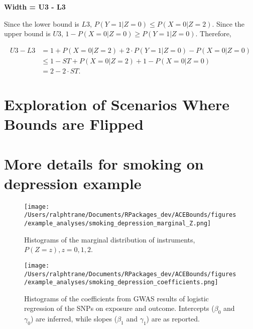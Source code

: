 \documentclass[
]{article}
\theoremstyle{plain}
\begin{document}
\textbf{Width = U3 - L3}

Since the lower bound is \(L3\), \(P(Y = 1 | Z = 0) \le P(X = 0 | Z = 2)\). Since the upper bound is \(U3\), \(1 - P(X = 0 | Z = 0) \ge P(Y = 1 | Z = 0)\). Therefore,

\[\begin{aligned}
U3 - L3 &= 1 + P(X = 0 | Z = 2) + 2\cdot P(Y = 1 | Z = 0) - P(X = 0 | Z = 0) \\
        &\le 1 - ST + P(X = 0 | Z = 2) + 1 - P(X = 0 | Z = 0) \\
        &= 2 - 2\cdot ST.
\end{aligned}\]

\newpage

\hypertarget{exploration-of-scenarios-where-bounds-are-flipped}{%
\section{Exploration of Scenarios Where Bounds are Flipped}\label{exploration-of-scenarios-where-bounds-are-flipped}}

\hypertarget{more-details-for-smoking-on-depression-example}{%
\section{\texorpdfstring{More details for smoking on depression example \label{smoking-on-depression-appendix}}{More details for smoking on depression example }}\label{more-details-for-smoking-on-depression-example}}

\begin{figure}[H]
  \center
  \texttt{[image: /Users/ralphtrane/Documents/RPackages\_dev/ACEBounds/figures/example\_analyses/smoking\_depression\_marginal\_Z.png]}
  \caption{Histograms of the marginal distribution of instruments, $P(Z = z), z=0,1,2$.}
  \label{fig:marginal-distribution-of-instruments}
\end{figure}

\begin{figure}[H]
  \center
  \texttt{[image: /Users/ralphtrane/Documents/RPackages\_dev/ACEBounds/figures/example\_analyses/smoking\_depression\_coefficients.png]}
  \caption{Histograms of the coefficients from GWAS results of logistic regression of the SNPs on exposure and outcome. Intercepts ($\beta_0$ and $\gamma_0$) are inferred, while slopes ($\beta_1$ and $\gamma_1$) are as reported.}
  \label{fig:marginal-distribution-of-coefficients}
\end{figure}
\end{document}
